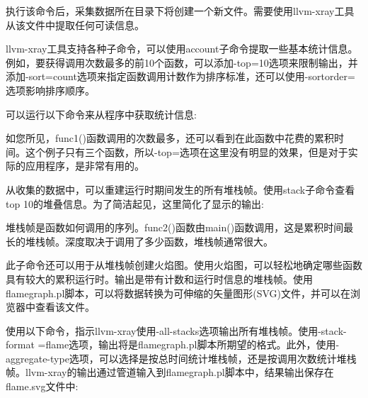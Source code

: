 执行该命令后，采集数据所在目录下将创建一个新文件。需要使用llvm-xray工具从该文件中提取任何可读信息。

llvm-xray工具支持各种子命令，可以使用account子命令提取一些基本统计信息。例如，要获得调用次数最多的前10个函数，可以添加-top=10选项来限制输出，并添加-sort=count选项来指定函数调用计数作为排序标准，还可以使用-sortorder=选项影响排序顺序。

可以运行以下命令来从程序中获取统计信息:


如您所见，func1()函数调用的次数最多，还可以看到在此函数中花费的累积时间。这个例子只有三个函数，所以-top=选项在这里没有明显的效果，但是对于实际的应用程序，是非常有用的。

从收集的数据中，可以重建运行时期间发生的所有堆栈帧。使用stack子命令查看top 10的堆叠信息。为了简洁起见，这里简化了显示的输出:


堆栈帧是函数如何调用的序列。func2()函数由main()函数调用，这是累积时间最长的堆栈帧。深度取决于调用了多少函数，堆栈帧通常很大。

此子命令还可以用于从堆栈帧创建火焰图。使用火焰图，可以轻松地确定哪些函数具有较大的累积运行时。输出是带有计数和运行时信息的堆栈帧。使用flamegraph.pl脚本，可以将数据转换为可伸缩的矢量图形(SVG)文件，并可以在浏览器中查看该文件。

使用以下命令，指示llvm-xray使用-all-stacks选项输出所有堆栈帧。使用-stack-format =flame选项，输出将是flamegraph.pl脚本所期望的格式。此外，使用-aggregate-type选项，可以选择是按总时间统计堆栈帧，还是按调用次数统计堆栈帧。llvm-xray的输出通过管道输入到flamegraph.pl脚本中，结果输出保存在flame.svg文件中:

